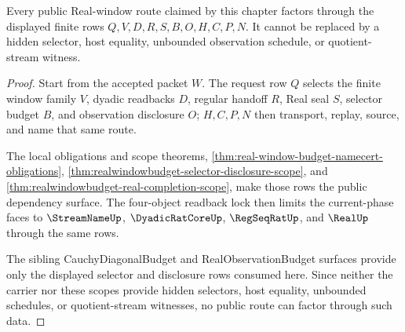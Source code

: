 \begin{theorem}
\label{thm:real-window-budget-diagonal-observation-route-exhaustion}
Every public Real-window route claimed by this chapter factors through the
displayed finite rows $Q,V,D,R,S,B,O,H,C,P,N$. It cannot be replaced by a
hidden selector, host equality, unbounded observation schedule, or
quotient-stream witness.
\end{theorem}
\begin{proof}
Start from the accepted packet $W$. The request row $Q$ selects the finite
window family $V$, dyadic readbacks $D$, regular handoff $R$, Real seal $S$,
selector budget $B$, and observation disclosure $O$; $H,C,P,N$ then transport,
replay, source, and name that same route.

The local obligations and scope theorems,
\autoref{thm:real-window-budget-namecert-obligations},
\autoref{thm:realwindowbudget-selector-disclosure-scope}, and
\autoref{thm:realwindowbudget-real-completion-scope}, make those rows the
public dependency surface. The four-object readback lock then limits the
current-phase faces to $\StreamNameUp$, $\DyadicRatCoreUp$, $\RegSeqRatUp$,
and $\RealUp$ through the same rows.

The sibling CauchyDiagonalBudget and RealObservationBudget surfaces provide
only the displayed selector and disclosure rows consumed here. Since neither
the carrier nor these scopes provide hidden selectors, host equality, unbounded
schedules, or quotient-stream witnesses, no public route can factor through
such data.
\end{proof}

